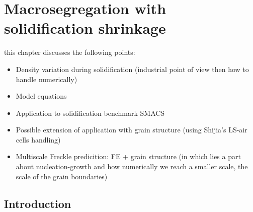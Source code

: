 \chapter{Macrosegregation with solidification shrinkage}
\minitoc
\newpage

this chapter discusses the following points:
\begin{itemize}
\item Density variation during solidification (industrial point of view then how to handle numerically)
\item Model equations
\item Application to solidification benchmark SMACS
\item Possible extension of application with grain structure (using Shijia's LS-air cells handling)
\item Multiscale Freckle predicition: FE + grain structure (in which lies a part about nucleation-growth and how numerically 
		we reach a smaller scale, the scale of the grain boundaries)
\end{itemize}


\section{Introduction}


